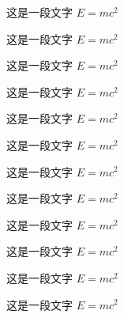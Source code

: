 \documentclass{xdyy-usermanual}
\begin{document}
\begin{vexample}
    \begin{definition}[Euclid定理]
      这是一段文字 $E = m c^2$
    \end{definition}
    
    \begin{theorem}[Euclid定理]
      这是一段文字 $E = m c^2$
    \end{theorem}
    
    \begin{example}[Euclid定理]
      这是一段文字 $E = m c^2$
    \end{example}
    
    \begin{property}[Euclid定理]
      这是一段文字 $E = m c^2$
    \end{property}
    
    \begin{proposition}[Euclid定理]
      这是一段文字 $E = m c^2$
    \end{proposition}
\end{vexample}

\begin{vexample}

    \begin{corollary}[Euclid定理]
      这是一段文字 $E = m c^2$
    \end{corollary}
    
    \begin{lemma}[Euclid定理]
      这是一段文字 $E = m c^2$
    \end{lemma}
    
    \begin{axiom}[Euclid定理]
      这是一段文字 $E = m c^2$
    \end{axiom}
    
    \begin{antiexample}[Euclid定理]
      这是一段文字 $E = m c^2$
    \end{antiexample}
    
    \begin{remark}
      这是一段文字 $E = m c^2$
    \end{remark}
    
    \begin{hint}
      这是一段文字 $E = m c^2$
    \end{hint}
    
    \begin{summary}
      这是一段文字 $E = m c^2$
    \end{summary}
\end{vexample}
\end{document}
